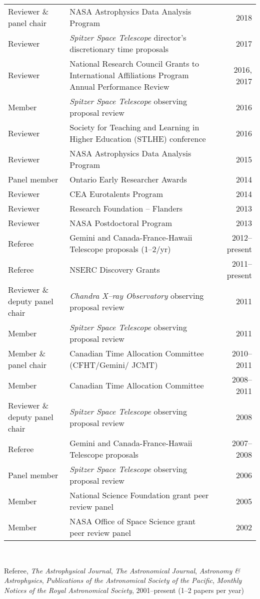 \begin{tabularx}{\textwidth}{lXr}
Reviewer \& panel chair& NASA Astrophysics Data Analysis Program& 2018\\
Reviewer & {\it Spitzer Space Telescope\/} director's discretionary time proposals & 2017\\
Reviewer & National Research Council Grants to International Affiliations Program Annual Performance Review & 2016, 2017\\
Member& {\it Spitzer Space Telescope\/} observing proposal review&  2016\\
Reviewer & Society for Teaching and Learning in Higher Education (STLHE) conference & 2016\\
Reviewer& NASA Astrophysics Data Analysis Program& 2015\\
Panel member & Ontario Early Researcher Awards & 2014\\
Reviewer&  CEA Eurotalents Program & 2014\\
Reviewer& Research Foundation -- Flanders& 2013\\
Reviewer& NASA Postdoctoral Program& 2013\\
Referee& Gemini and Canada-France-Hawaii Telescope proposals (1--2/yr)& 2012--present\\
Referee& NSERC Discovery Grants& 2011--present\\
Reviewer \& deputy panel chair& {\it Chandra X--ray Observatory\/} observing proposal review& 2011\\
Member& {\it Spitzer Space Telescope\/} observing proposal review&  2011\\
Member \& panel chair& Canadian Time Allocation Committee (CFHT/Gemini/ JCMT)& 2010--2011\\
Member& Canadian Time Allocation Committee& 2008--2011\\
Reviewer \& deputy panel chair& {\it Spitzer Space Telescope\/} observing proposal review& 2008\\
Referee& Gemini and Canada-France-Hawaii Telescope proposals& 2007--2008\\
Panel member& {\it Spitzer Space Telescope\/} observing proposal review& 2006\\
Member& National Science Foundation grant peer review panel& 2005\\
Member& NASA Office of Space Science grant peer review panel& 2002\\
\end{tabularx}\\
\vspace{0.3cm}

Referee, {\it The Astrophysical Journal}, {\it The Astronomical Journal}, {\it Astronomy \& Astrophysics},
{\it Publications of the Astronomical Society of the Pacific}, {\it Monthly Notices of the Royal Astronomical Society},
2001--present (1--2 papers per year)
